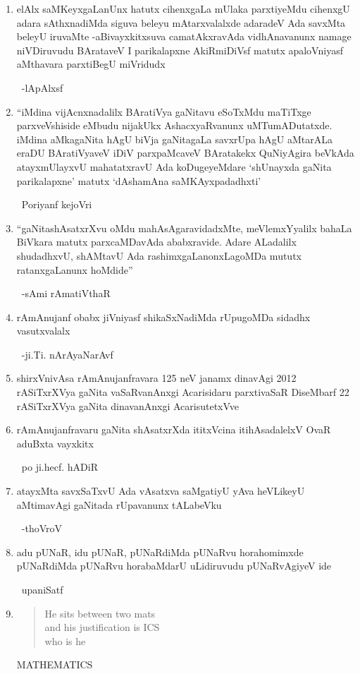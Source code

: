 \begin{enumerate}[\rm 1)]
\item elAlx saMKeyxgaLanUnx hatutx cihenxgaLa mUlaka parxtiyeMdu cihenxgU adara sAthxnadiMda siguva beleyu mAtarxvalalxde adaradeV Ada savxMta beleyU iruvaMte -aBivayxkitxsuva camatAkxravAda vidhAnavanunx namage niVDiruvudu BArataveV I parikalapxne AkiRmiDiVsf matutx apaloVniyasf aMthavara parxtiBegU miVridudx

~\hfill -lApAlxsf

\item ``iMdina vijAcnxnadalilx BAratiVya gaNitavu eSoTxMdu maTiTxge parxveVshiside eMbudu nijakUkx AshacxyaRvanunx uMTumADutatxde. iMdina aMkagaNita hAgU biVja gaNitagaLa savxrUpa hAgU aMtarALa eraDU BAratiVyaveV iDiV parxpaMcaveV BAratakekx QuNiyAgira beVkAda atayxmUlayxvU mahatatxravU Ada koDugeyeMdare `shUnayxda gaNita parikalapxne' matutx `dAshamAna saMKAyxpadadhxti'

~\hfill Poriyanf kejoVri

\item ``gaNitashAsatxrXvu oMdu mahAsAgaravidadxMte, meVlemxYyalilx bahaLa BiVkara matutx parxcaMDavAda ababxravide. Adare ALadalilx shudadhxvU, shAMtavU Ada rashimxgaLanonxLagoMDa mututx ratanxgaLanunx hoMdide''

~\hfill -sAmi rAmatiVthaR

\item rAmAnujanf obabx jiVniyasf shikaSxNadiMda rUpugoMDa sidadhx vasutxvalalx 

~\hfill -ji.Ti. nArAyaNarAvf

\item shirxVnivAsa rAmAnujanfravara {\rm 125} neV janamx dinavAgi {\rm 2012} rASiTxrXVya gaNita vaSaRvanAnxgi Acarisidaru parxtivaSaR DiseMbarf {\rm 22} rASiTxrXVya gaNita dinavanAnxgi AcarisutetxVve

\item rAmAnujanfravaru gaNita shAsatxrXda ititxVcina itihAsadalelxV OvaR aduBxta vayxkitx 

~\hfill po ji.hecf. hADiR

\item atayxMta savxSaTxvU Ada vAsatxva saMgatiyU yAva heVLikeyU aMtimavAgi gaNitada rUpavanunx tALabeVku

~\hfill -thoVroV

\item adu pUNaR, idu pUNaR, pUNaRdiMda pUNaRvu horahomimxde pUNaRdiMda pUNaRvu horabaMdarU uLidiruvudu pUNaRvAgiyeV ide

~\hfill upaniSatf

\item 
\begin{verse}
{\rm He sits between two mats}\\
{\rm and his justification is ICS}\\
{\rm who is he}
\end{verse}
\begin{flushright}
{\rm MATHEMATICS}
\end{flushright}
\end{enumerate}



